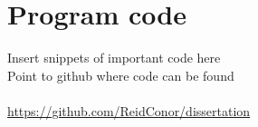 %
%
%
%

\chapter{Program code}\label{C.Appendix2}

Insert snippets of important code here \\
Point to github where code can be found\\\\ 
\url{https://github.com/ReidConor/dissertation}
